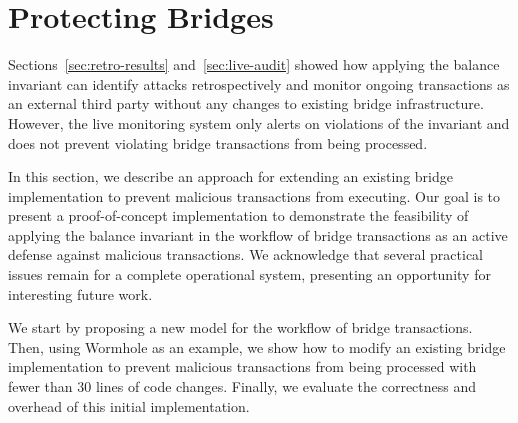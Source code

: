 \section{Protecting Bridges}
\label{sec:active-protect}

Sections~\ref{sec:retro-results} and~\ref{sec:live-audit} showed how
applying the balance invariant can identify attacks retrospectively and
monitor ongoing transactions as an external third party without any
changes to existing bridge infrastructure.  However, the live
monitoring system only alerts on violations of the invariant and does
not prevent violating bridge transactions from being processed.

In this section, we describe an approach for extending an existing
bridge implementation to prevent malicious transactions from
executing.  Our goal is to present a proof-of-concept implementation
to demonstrate the feasibility of applying the balance invariant in the
workflow of bridge transactions as an active defense against malicious
transactions.  We acknowledge that several practical issues remain
for a complete operational system, presenting an opportunity for
interesting future work.




We start by proposing a new model for the workflow of bridge
transactions.  Then, using Wormhole as an example, we show how to
modify an existing bridge implementation to prevent malicious transactions from
being processed with fewer than 30 lines of code changes.  Finally, we
evaluate the correctness and overhead of this initial implementation.

